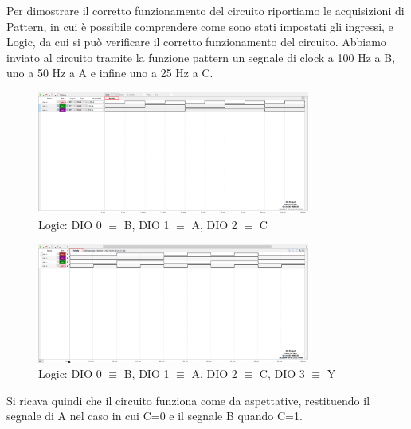\documentclass[10pt, a4paper, italian]{article}
\begin{document}
Per dimostrare il corretto funzionamento del circuito riportiamo le acquisizioni di Pattern, in cui è possibile comprendere come sono stati impostati gli ingressi, e Logic, da cui si può verificare il corretto funzionamento del circuito.
Abbiamo inviato al circuito tramite la funzione pattern un segnale di clock a 100 Hz a B, uno a 50 Hz a A e infine uno a 25 Hz a C.
\begin{figure}[htbp]
    \centering
    \includegraphics[width=0.8\textwidth]{pat2.png}
    \caption{Logic: DIO 0 $\equiv$ B, DIO 1 $\equiv$ A, DIO 2 $\equiv$ C}
    \label{logic2}
\end{figure}
\begin{figure}[htbp]
    \centering
    \includegraphics[width=0.8\textwidth]{Multiplex.png}
    \caption{Logic: DIO 0 $\equiv$ B, DIO 1 $\equiv$ A, DIO 2 $\equiv$ C, DIO 3 $\equiv$ Y}
    \label{logic2}
\end{figure}
Si ricava quindi che il circuito funziona come da aspettative, restituendo il segnale di A nel caso in cui C=0 e il segnale B quando C=1.
\end{document}
